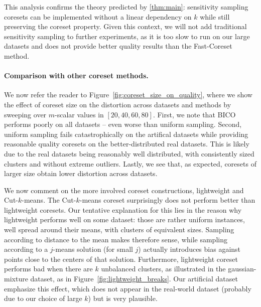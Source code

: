 This analysis confirms the theory predicted by \cref{thm:main}: sensitivity sampling coresets can be
implemented without a linear dependency on $k$ while still preserving the coreset property. Given this context, we will not add traditional sensitivity sampling
to further experiments, as it is too slow to run on our large datasets and does not provide better quality results than the Fast-Coreset method.

\paragraph*{Comparison with other coreset methods.}
We now refer the reader to Figure~\ref{fig:coreset_size_on_quality}, where we show the effect of coreset size on the distortion across datasets and methods by
sweeping over $m$-scalar values in $[20, 40, 60, 80]$. 
First, we note that BICO performs poorly on all datasets -- even worse than uniform sampling.
Second, uniform sampling fails catastrophically on the artifical datasets while providing reasonable quality coresets on the better-distributed real datasets.
This is likely due to the real datasets being reasonably well distributed, with consistently sized clusters and without extreme outliers.
Lastly, we see that, as expected, coresets of larger size obtain lower distortion across datasets.


We now comment on the more involved coreset constructions, lightweight and Cut-$k$-means. The Cut-$k$-means coreset surprisingly does not perform better than
lightweight coresets. Our tentative explanation for this lies in the reason why lightweight performs well on some dataset: those are rather uniform instances, well
spread around their means, with clusters of equivalent sizes.  Sampling according to distance to the mean makes therefore sense,
while sampling according to a $j$-means solution (for small $j$) actually introduces bias against points close to the centers of that solution.  Furthermore,
lightweight coreset performs bad when there are $k$ unbalanced clusters, as illustrated in the gaussian-mixture dataset, as in
Figure~\ref{fig:lightweight_breaks}.  Our artificial dataset emphasize this effect, which does not appear in the real-world dataset (probably due to our choice
of large $k$) but is very plausible.  

